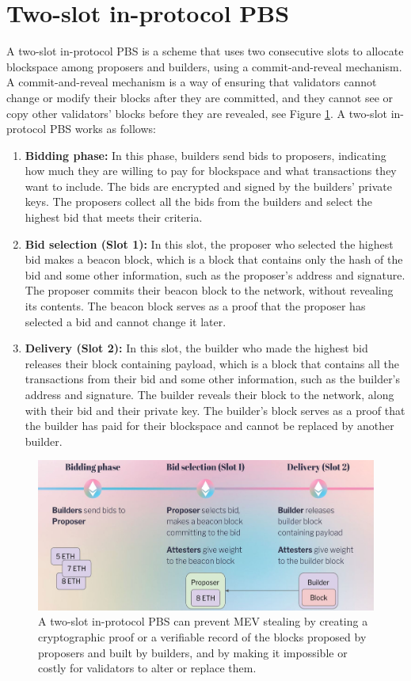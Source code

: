 \section{Two-slot in-protocol PBS}
A two-slot in-protocol PBS is a scheme that uses two consecutive slots to allocate blockspace among proposers and builders, using a commit-and-reveal mechanism. A commit-and-reveal mechanism is a way of ensuring that validators cannot change or modify their blocks after they are committed, and they cannot see or copy other validators’ blocks before they are revealed, see Figure \ref{fig:L22_f5}. A two-slot in-protocol PBS works as follows:
\begin{enumerate}
	\item \textbf{Bidding phase:} In this phase, builders send bids to proposers, indicating how much they are willing to pay for blockspace and what transactions they want to include. The bids are encrypted and signed by the builders’ private keys. The proposers collect all the bids from the builders and select the highest bid that meets their criteria.
	\item \textbf{Bid selection (Slot 1):} In this slot, the proposer who selected the highest bid makes a beacon block, which is a block that contains only the hash of the bid and some other information, such as the proposer’s address and signature. The proposer commits their beacon block to the network, without revealing its contents. The beacon block serves as a proof that the proposer has selected a bid and cannot change it later.
	\item \textbf{Delivery (Slot 2):} In this slot, the builder who made the highest bid releases their block containing payload, which is a block that contains all the transactions from their bid and some other information, such as the builder’s address and signature. The builder reveals their block to the network, along with their bid and their private key. The builder’s block serves as a proof that the builder has paid for their blockspace and cannot be replaced by another builder.
\end{enumerate}
\begin{center}
	\begin{figure}
		\centering
		\includegraphics[width=1\linewidth]{Fig/22/F5}
		\caption{A two-slot in-protocol PBS can prevent MEV stealing by creating a cryptographic proof or a verifiable record of the blocks proposed by proposers and built by builders, and by making it impossible or costly for validators to alter or replace them.}
		\label{fig:L22_f5}
	\end{figure}
\end{center}

